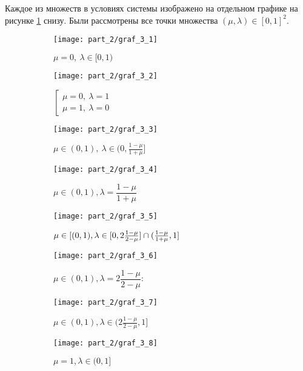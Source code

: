 Каждое из множеств в условиях системы изображено на отдельном графике
на рисунке \ref{fig:lambda_mu_set} снизу. Были рассмотрены все точки
множества $(\mu, \lambda) \in [0,1]^2$.

\begin{figure}[H]
	\centering
	\begin{subfigure}[b]{0.3 \textwidth}
		\texttt{[image: part\_2/graf\_3\_1]}
		\caption{$\mu = 0, \: \lambda \in [0, 1)$}
	\end{subfigure}
	\begin{subfigure}[b]{0.3 \textwidth}
		\texttt{[image: part\_2/graf\_3\_2]}
		\caption{
			$
			\left[
			\begin{array}{c}
     			\mu=0, \: \lambda = 1 \\
     			\mu=1, \: \lambda = 0
  			\end{array}
			\right.
			$
		}
	\end{subfigure}
	\begin{subfigure}[b]{0.3 \textwidth}	
		\texttt{[image: part\_2/graf\_3\_3]}
		\caption{
			$
				\mu \in (0,1), \:
				\lambda \in (0, \frac{1 - \mu}{1 + \mu}]
			$		
		}
	\end{subfigure}
	\newline	
	\centering
	\begin{subfigure}[b]{0.3 \textwidth}
		\texttt{[image: part\_2/graf\_3\_4]}
		\caption{
			$\mu \in (0,1), \lambda = \dfrac{1-\mu}{1+\mu}$		
		}
	\end{subfigure}
	\begin{subfigure}[b]{0.3 \textwidth}
		\texttt{[image: part\_2/graf\_3\_5]}
		\caption{
			$\mu \in [(0, 1), \newline 
			\lambda \in 
			[0, 2\frac{1 - \mu}{2 - \mu}] \cap 
			(\frac{1 - \mu}{1 + \mu}, 1]$
		}
	\end{subfigure}
	\begin{subfigure}[b]{0.3 \textwidth}	
		\texttt{[image: part\_2/graf\_3\_6]}
		\caption{
			$\mu \in (0, 1), \lambda = 2\dfrac{1 - \mu}{2 - \mu}$: 
		}
	\end{subfigure}
	\newline
	\begin{subfigure}[b]{0.3 \textwidth}
		\texttt{[image: part\_2/graf\_3\_7]}
		\caption{
			$\mu \in (0, 1), 
			\lambda \in (2\frac{1 - \mu}{2 - \mu}, 1]$		
		}
	\end{subfigure}
	\begin{subfigure}[b]{0.3 \textwidth}
		\texttt{[image: part\_2/graf\_3\_8]}
		\caption{
			$\mu = 1, \lambda \in (0, 1] $		
		}
	\end{subfigure}
	\caption{}
	\label{fig:lambda_mu_set}
\end{figure}